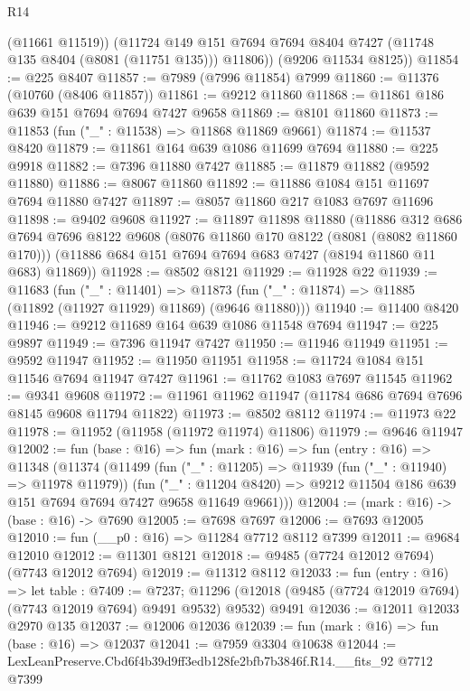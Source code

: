 \begin{lexlean}{R14}
\begin{coremodule}
          (@11661 @11519))
        (@11724 @149 @151 @7694 @7694 @8404 @7427 (@11748 @135 @8404 (@8081 (@11751 @135))) @11806))
      (@9206 @11534 @8125))
@11854 := @225 @8407
@11857 := @7989 (@7996 @11854) @7999
@11860 := @11376 (@10760 (@8406 @11857))
@11861 := @9212 @11860
@11868 := @11861 @186 @639 @151 @7694 @7694 @7427 @9658
@11869 := @8101 @11860
@11873 := @11853 (fun ("_" : @11538) => @11868 @11869 @9661)
@11874 := @11537 @8420
@11879 := @11861 @164 @639 @1086 @11699 @7694
@11880 := @225 @9918
@11882 := @7396 @11880 @7427
@11885 := @11879 @11882 (@9592 @11880)
@11886 := @8067 @11860
@11892 := @11886 @1084 @151 @11697 @7694 @11880 @7427
@11897 := @8057 @11860 @217 @1083 @7697 @11696
@11898 := @9402 @9608
@11927 := @11897
    @11898
    @11880
    (@11886
      @312
      @686
      @7694
      @7696
      @8122
      @9608
      (@8076 @11860 @170 @8122 (@8081 (@8082 @11860 @170)))
      (@11886 @684 @151 @7694 @7694 @683 @7427 (@8194 @11860 @11 @683) @11869))
@11928 := @8502 @8121
@11929 := @11928 @22
@11939 := @11683
    (fun ("_" : @11401) =>
    @11873 (fun ("_" : @11874) => @11885 (@11892 (@11927 @11929) @11869) (@9646 @11880)))
@11940 := @11400 @8420
@11946 := @9212 @11689 @164 @639 @1086 @11548 @7694
@11947 := @225 @9897
@11949 := @7396 @11947 @7427
@11950 := @11946 @11949
@11951 := @9592 @11947
@11952 := @11950 @11951
@11958 := @11724 @1084 @151 @11546 @7694 @11947 @7427
@11961 := @11762 @1083 @7697 @11545
@11962 := @9341 @9608
@11972 := @11961 @11962 @11947 (@11784 @686 @7694 @7696 @8145 @9608 @11794 @11822)
@11973 := @8502 @8112
@11974 := @11973 @22
@11978 := @11952 (@11958 (@11972 @11974) @11806)
@11979 := @9646 @11947
@12002 := fun (base : @16) =>
  fun (mark : @16) =>
  fun (entry : @16) =>
  @11348
    (@11374
      (@11499
        (fun ("_" : @11205) => @11939 (fun ("_" : @11940) => @11978 @11979))
        (fun ("_" : @11204 @8420) =>
        @9212 @11504 @186 @639 @151 @7694 @7694 @7427 @9658 @11649 @9661)))
@12004 := (mark : @16) -> (base : @16) -> @7690
@12005 := @7698 @7697
@12006 := @7693 @12005
@12010 := fun (__p0 : @16) => @11284 @7712 @8112 @7399
@12011 := @9684 @12010
@12012 := @11301 @8121
@12018 := @9485 (@7724 @12012 @7694) (@7743 @12012 @7694)
@12019 := @11312 @8112
@12033 := fun (entry : @16) =>
  let table : @7409 := @7237;
  @11296 (@12018 (@9485 (@7724 @12019 @7694) (@7743 @12019 @7694) @9491 @9532) @9532) @9491
@12036 := @12011 @12033 @2970 @135
@12037 := @12006 @12036
@12039 := fun (mark : @16) => fun (base : @16) => @12037
@12041 := @7959 @3304 @10638
@12044 := LexLeanPreserve.Cbd6f4b39d9ff3edb128fe2bfb7b3846f.R14.__fits_92 @7712 @7399

\end{coremodule}
\end{lexlean}
